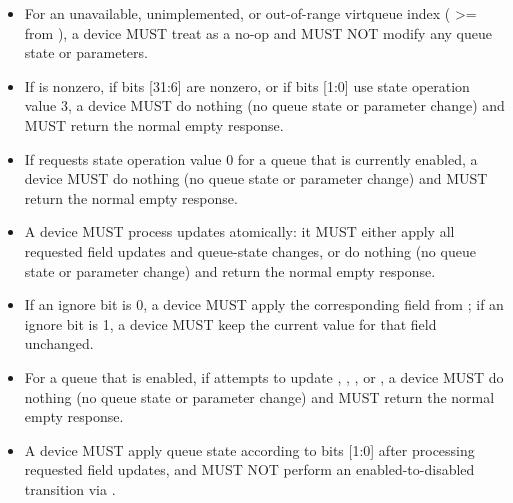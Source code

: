 \begin{itemize}
  \item For an unavailable, unimplemented, or out-of-range virtqueue index
        ( >=  from ),
        a device MUST treat  as a no-op and MUST NOT modify
        any queue state or parameters.
  \item If  is nonzero, if  bits [31:6] are
        nonzero, or if  bits [1:0] use state operation value 3, a
        device MUST do nothing (no queue state or parameter change) and MUST
        return the normal empty  response.
  \item If  requests state operation value 0 for a queue that is
        currently enabled, a device MUST do nothing (no queue state or
        parameter change) and MUST return the normal empty
         response.
  \item A device MUST process  updates atomically: it MUST
        either apply all requested field updates and queue-state changes, or
        do nothing (no queue state or parameter change) and return the normal
        empty  response.
  \item If an ignore bit is 0, a device MUST apply the corresponding field from
        ; if an ignore bit is 1, a device MUST keep the
        current value for that field unchanged.
  \item For a queue that is enabled, if  attempts to update
        , , , or
        , a device MUST do nothing (no queue state or
        parameter change) and MUST return the normal empty
         response.
  \item A device MUST apply queue state according to  bits [1:0]
        after processing requested field updates, and MUST NOT perform an
        enabled-to-disabled transition via .
\end{itemize}


